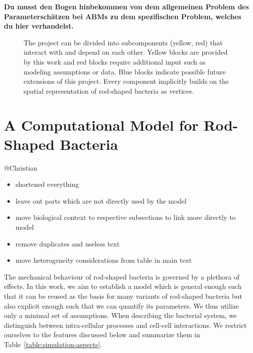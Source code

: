 \documentclass{article}
\begin{document}
\textbf{
    Du musst den Bogen hinbekommen von dem allgemeinen Problem des Parameterschätzen bei ABMs zu dem
    spezifischen Problem, welches du hier verhandelst.
}

\begin{figure}[H]
    \centering
    
    \caption{
        The project can be divided into subcomponents (yellow, red) that interact with and depend on
        each other.
        Yellow blocks are provided by this work and red blocks require additional input such as
        modeling assumptions or data.
        Blue blocks indicate possible future extensions of this project.
        Every component implicitly builds on the spatial representation of rod-shaped bacteria as
        vertices.
    }
    \label{fig:flowchart-project-structure}
\end{figure}

\section{A Computational Model for Rod-Shaped Bacteria}
\label{sec:computational-model}

@Christian
\begin{itemize}
    \item shortened everything
    \item leave out parts which are not directly used by the model
    \item move biological context to respective subsections to link more directly to model
    \item remove duplicates and useless text
    \item move heterogeneity considerations from table in main text
\end{itemize}

The mechanical behaviour of rod-shaped bacteria is governed by a plethora of effects.
In this work, we aim to establish a model which is general enough such that it can be reused as the
basis for many variants of rod-shaped bacteria but also explicit enough such that we can quantify
its parameters.
We thus utilize only a minimal set of assumptions.
When describing the bacterial system, we distinguish between intra-cellular processes and cell-cell
interactions.
We restrict ourselves to the features discussed below and summarize them in
Table~\ref{table:simulation-aspects}.
\end{document}
